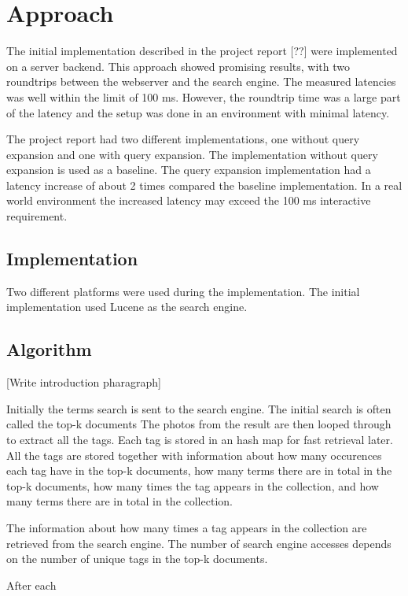 \chapter{Approach}
\label{ch:approach}
The initial implementation described in the project report [??] were implemented on a server backend.
This approach showed promising results, with two roundtrips between the webserver and the search engine.
The measured latencies was well within the limit of 100 ms.
However, the roundtrip time was a large part of the latency and the setup was done in an environment with minimal latency.

The project report had two different implementations, one without query expansion and one with query expansion.
The implementation without query expansion is used as a baseline.
The query expansion implementation had a latency increase of about 2 times compared the baseline implementation.
In a real world environment the increased latency may exceed the 100 ms interactive requirement.

\section{Implementation}
Two different platforms were used during the implementation.
The initial implementation used Lucene as the search engine.

\section{Algorithm}
[Write introduction pharagraph]

Initially the terms search is sent to the search engine.
The initial search is often called the top-k documents
The photos from the result are then looped through to extract all the tags.
Each tag is stored in an hash map for fast retrieval later.
All the tags are stored together with information about how many occurences each tag have in the top-k documents,
how many terms there are in total in the top-k documents,
how many times the tag appears in the collection,
and how many terms there are in total in the collection.

The information about how many times a tag appears in the collection are retrieved from the search engine.
The number of search engine accesses depends on the number of unique tags in the top-k documents.

After each



